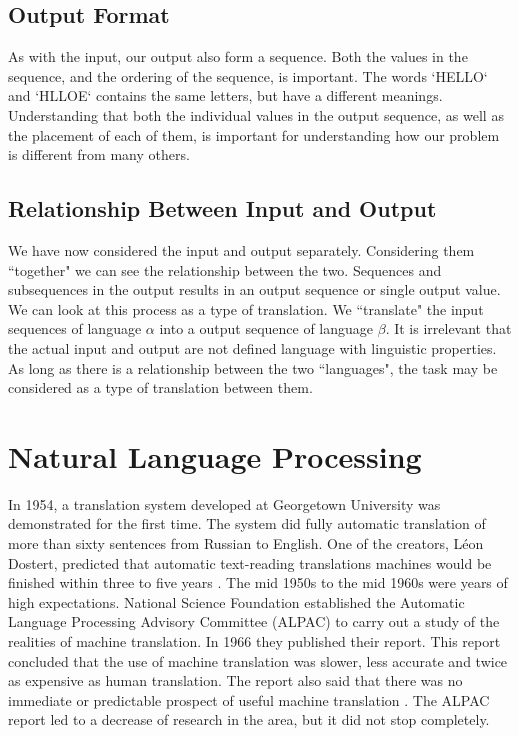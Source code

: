 \subsection{Output Format}
As with the input, our output also form a sequence. Both the values in the sequence, and the ordering of the sequence, is important. The words `HELLO` and `HLLOE` contains the same letters, but have a different meanings. Understanding that both the individual values in the output sequence, as well as the placement of each of them, is important for understanding how our problem is different from many others.

\subsection{Relationship Between Input and Output}
We have now considered the input and output separately. Considering them ``together" we can see the relationship between the two. Sequences and subsequences in the output results in an output sequence or single output value. We can look at this process as a type of translation. We ``translate" the input sequences of language $\alpha$ into a output sequence of language $\beta$. It is irrelevant that the actual input and output are not defined language with linguistic properties. As long as there is a relationship between the two ``languages", the task may be considered as a type of translation between them. 


\section{Natural Language Processing}
\label{sec:natural_language_processing}
In 1954, a translation system developed at Georgetown University was demonstrated for the first time. The system did fully automatic translation of more than sixty sentences from Russian to English. One of the creators, Léon Dostert, predicted that automatic text-reading translations machines would be finished within three to five years \citep{hutchins1997first}. The mid 1950s to the mid 1960s were years of high expectations. National Science Foundation established the Automatic Language Processing Advisory Committee (ALPAC) to carry out a study of the realities of machine translation. In 1966 they published their report. This report concluded that the use of machine translation was slower, less accurate and twice as expensive as human translation. The report also said that there was no immediate or predictable prospect of useful machine translation \citep{hutchins2007machine, national1966language, koehn2010statistical}. The ALPAC report led to a decrease of research in the area, but it did not stop completely.

